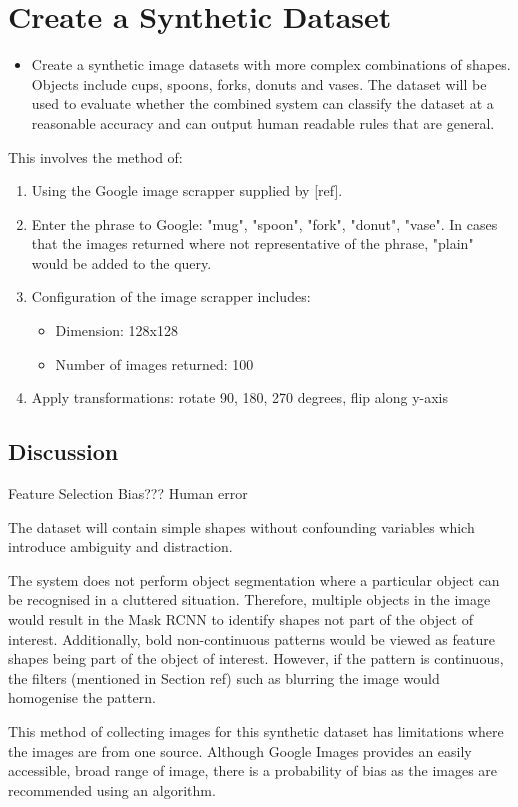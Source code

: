 \section{Create a Synthetic Dataset}
\begin{itemize}
	\item Create a synthetic image datasets with more complex combinations of shapes. Objects include cups, spoons, forks, donuts and vases. The dataset will be used to evaluate whether the combined system can classify the dataset at a reasonable accuracy and can output human readable rules that are general.  
\end{itemize}
This involves the method of:
\begin{enumerate}
	\item Using the Google image scrapper supplied by [ref].
	\item Enter the phrase to Google: "mug", "spoon", "fork", "donut", "vase". In cases that the images returned where not representative of the phrase, "plain" would be added to the query.
	\item Configuration of the image scrapper includes:
		\begin{itemize}
			\item Dimension: 128x128
			\item Number of images returned: 100
		\end{itemize}
	\item Apply transformations: rotate 90, 180, 270 degrees, flip along y-axis
\end{enumerate}

\subsection{Discussion}
Feature Selection Bias??? Human error

The dataset will contain simple shapes without confounding variables which introduce ambiguity and distraction. 

The system does not perform object segmentation where a particular object can be recognised in a cluttered situation. Therefore, multiple objects in the image would result in the Mask RCNN to identify shapes not part of the object of interest. Additionally, bold non-continuous patterns would be viewed as feature shapes being part of the object of interest. However, if the pattern is continuous, the filters (mentioned in Section ref) such as blurring the image would homogenise the pattern. 

This method of collecting images for this synthetic dataset has limitations where the images are from one source. Although Google Images provides an easily accessible, broad range of image, there is a probability of bias as the images are recommended using an algorithm. 

